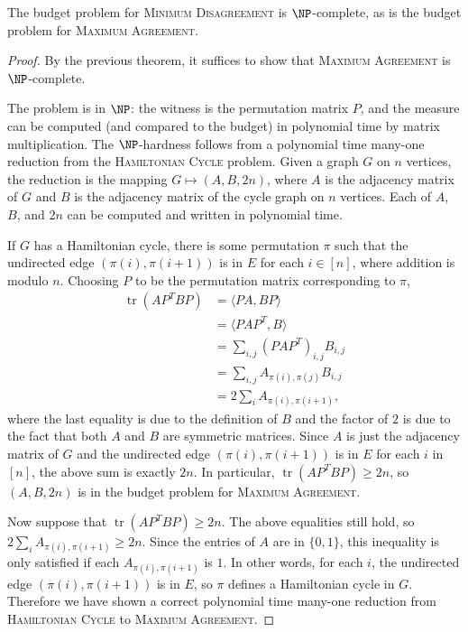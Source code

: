 \documentclass{article}
\newcommand{\1}{\mathbf{1}}
\newcommand{\MD}{\textsc{Minimum Disagreement}}
\renewcommand{\MA}{\textsc{Maximum Agreement}}
\DeclareMathOperator{\tr}{tr}
\begin{document}
\begin{theorem}
  The budget problem for \MD{} is $\NP$-complete, as is the budget problem for \MA{}.
\end{theorem}
\begin{proof}
  By the previous theorem, it suffices to show that \MA{} is $\NP$-complete.

  The problem is in $\NP$: the witness is the permutation matrix $P$, and the measure can be computed (and compared to the budget) in polynomial time by matrix multiplication.
  The $\NP$-hardness follows from a polynomial time many-one reduction from the \textsc{Hamiltonian Cycle} problem.
  Given a graph $G$ on $n$ vertices, the reduction is the mapping $G \mapsto (A, B, 2n)$, where $A$ is the adjacency matrix of $G$ and $B$ is the adjacency matrix of the cycle graph on $n$ vertices.
  Each of $A$, $B$, and $2n$ can be computed and written in polynomial time.

  If $G$ has a Hamiltonian cycle, there is some permutation $\pi$ such that the undirected edge $(\pi(i), \pi(i + 1))$ is in $E$ for each $i \in [n]$, where addition is modulo $n$.
  Choosing $P$ to be the permutation matrix corresponding to $\pi$,
  \begin{align*}
    \tr(AP^TBP) & = \langle PA, BP \rangle  \\
    & = \langle PAP^T, B \rangle \\
    & = \sum_{i, j} (PAP^T)_{i, j} B_{i, j} \\
    & = \sum_{i, j} A_{\pi(i), \pi(j)} B_{i, j} \\
    & = 2 \sum_i A_{\pi(i), \pi(i + 1)},
  \end{align*}
  where the last equality is due to the definition of $B$ and the factor of $2$ is due to the fact that both $A$ and $B$ are symmetric matrices.
  Since $A$ is just the adjacency matrix of $G$ and the undirected edge $(\pi(i), \pi(i + 1))$ is in $E$ for each $i$ in $[n]$, the above sum is exactly $2n$.
  In particular, $\tr(AP^TBP) \geq 2n$, so $(A, B, 2n)$ is in the budget problem for \MA{}.

  Now suppose that $\tr(AP^TBP) \geq 2n$.
  The above equalities still hold, so $2\sum_i A_{\pi(i), \pi(i + 1)} \geq 2n$.
  Since the entries of $A$ are in $\{0, 1\}$, this inequality is only satisfied if each $A_{\pi(i), \pi(i + 1)}$ is $1$.
  In other words, for each $i$, the undirected edge $(\pi(i), \pi(i + 1))$ is in $E$, so $\pi$ defines a Hamiltonian cycle in $G$.
  Therefore we have shown a correct polynomial time many-one reduction from \textsc{Hamiltonian Cycle} to \MA{}.
\end{proof}
\end{document}
